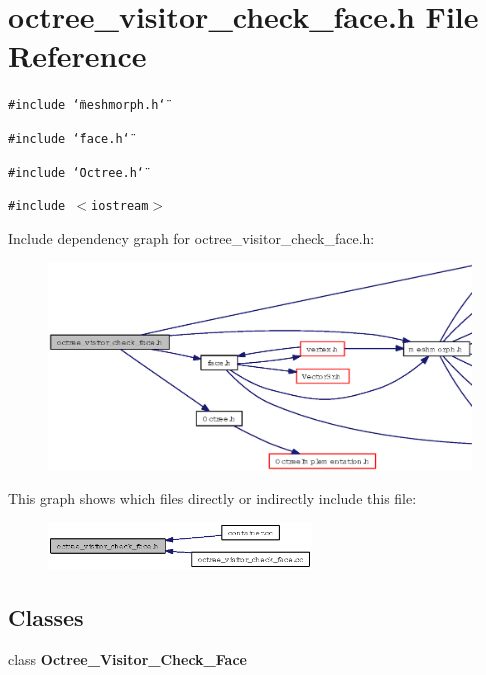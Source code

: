 \section{octree\_\-visitor\_\-check\_\-face.h File Reference}
\label{octree__visitor__check__face_8h}
{\tt \#include \char`\"{}meshmorph.h\char`\"{}}\par
{\tt \#include \char`\"{}face.h\char`\"{}}\par
{\tt \#include \char`\"{}Octree.h\char`\"{}}\par
{\tt \#include $<$iostream$>$}\par


Include dependency graph for octree\_\-visitor\_\-check\_\-face.h:\begin{figure}[H]
\begin{center}
\leavevmode
\includegraphics[width=360pt]{octree__visitor__check__face_8h__incl}
\end{center}
\end{figure}


This graph shows which files directly or indirectly include this file:\begin{figure}[H]
\begin{center}
\leavevmode
\includegraphics[width=198pt]{octree__visitor__check__face_8h__dep__incl}
\end{center}
\end{figure}
\subsection*{Classes}
\begin{CompactItemize}
\item 
class {\bf Octree\_\-Visitor\_\-Check\_\-Face}
\end{CompactItemize}
